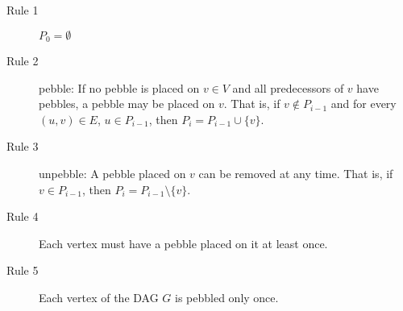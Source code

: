 \documentclass[runningheads]{llncs}
\theoremstyle{plain}
\theoremstyle{definition}
\begin{document}
\begin{description}
    \item[Rule 1] $P_0 = \emptyset$
    \item[Rule 2] pebble: If no pebble is placed on $v \in V$ and all predecessors of $v$ have pebbles, a pebble may be placed on $v$. That is, if $v \notin P_{i-1}$ and for every $(u, v) \in E$, $u \in P_{i-1}$, then $P_i = P_{i-1} \cup \{v\}$.
    \item[Rule 3] unpebble: A pebble placed on $v$ can be removed at any time. That is, if $v \in P_{i-1}$, then $P_i = P_{i-1} \setminus \{v\}$.
    \item[Rule 4] Each vertex must have a pebble placed on it at least once.
    \item[Rule 5] Each vertex of the DAG $G$ is pebbled only once.
\end{description}
\end{document}

